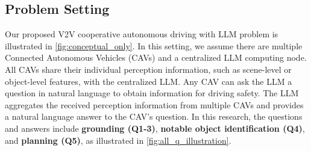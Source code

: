 \begin{figure*}[!t]
        \vspace{-4pt}
        \caption[]
        {
        Illustration of \namedataset's $5$ types of QA pairs. The arrows pointing at LLM indicate the perception data from CAVs.
        } 
        \label{fig:all_q_illustration}
        \vspace{-10pt}
\end{figure*}


\subsection{Problem Setting}
Our proposed V2V cooperative autonomous driving with LLM problem is illustrated in \cref{fig:conceptual_only}. In this setting, we assume there are multiple Connected Autonomous Vehicles (CAVs) and a centralized LLM computing node. All CAVs share their individual perception information, such as scene-level or object-level features, with the centralized LLM. Any CAV can ask the LLM a question in natural language to obtain information for driving safety. The LLM aggregates the received perception information from multiple CAVs and provides a natural language answer to the CAV's question. In this research, the questions and answers include \textbf{grounding (Q1-3)}, \textbf{notable object identification (Q4)}, and \textbf{planning (Q5)}, as illustrated in \cref{fig:all_q_illustration}. 


